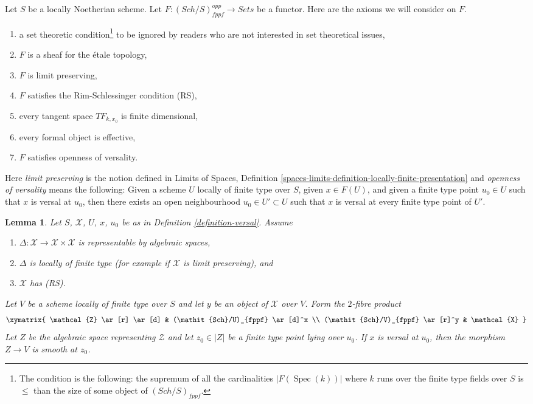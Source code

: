 \documentclass{amsart}
\theoremstyle{plain}
\newtheorem{lemma}[subsection]{Lemma}
\theoremstyle{definition}
\theoremstyle{remark}
\numberwithin{equation}{subsection}
\def\Spec{\mathop{\mathrm{Spec}}}
\def\Sch{\mathit{Sch}}
\begin{document}
\medskip\noindent
Let $S$ be a locally Noetherian scheme. Let
$F : (\Sch/S)_{fppf}^{opp} \to \textit{Sets}$ be a functor.
Here are the axioms we will consider on $F$.
\begin{enumerate}
\item[{[-1]}]  a set theoretic condition\footnote{The condition is the
following: the supremum of all the cardinalities
$|F(\Spec(k))|$ where $k$ runs over the finite
type fields over $S$ is $\leq$ than the size of some
object of $(\Sch/S)_{fppf}$.} to be ignored by
readers who are not interested in set theoretical issues,
\item[{[0]}] $F$ is a sheaf for the \'etale topology,
\item[{[1]}] $F$ is limit preserving,
\item[{[2]}] $F$ satisfies the Rim-Schlessinger condition (RS),
\item[{[3]}] every tangent space $TF_{k, x_0}$ is finite dimensional,
\item[{[4]}] every formal object is effective,
\item[{[5]}] $F$ satisfies openness of versality.
\end{enumerate}
Here {\it limit preserving} is the notion defined in
Limits of Spaces, Definition
\ref{spaces-limits-definition-locally-finite-presentation} and
{\it openness of versality} means the following: Given a scheme $U$
locally of finite type over $S$, given $x \in F(U)$, and given
a finite type point $u_0 \in U$ such that $x$ is versal at $u_0$,
then there exists an open neighbourhood $u_0 \in U' \subset U$
such that $x$ is versal at every finite type point of $U'$.








\begin{lemma}
\label{lemma-base-change-versal}
Let $S$, $\mathcal{X}$, $U$, $x$, $u_0$ be as in
Definition \ref{definition-versal}. Assume
\begin{enumerate}
\item $\Delta : \mathcal{X} \to \mathcal{X} \times \mathcal{X}$
is representable by algebraic spaces,
\item $\Delta$ is locally of finite type
(for example if $\mathcal{X}$ is limit preserving), and
\item $\mathcal{X}$ has (RS).
\end{enumerate}
Let $V$ be a scheme locally of finite type over $S$
and let $y$ be an object of $\mathcal{X}$ over $V$.
Form the $2$-fibre product
$$
\xymatrix{
\mathcal{Z} \ar[r] \ar[d] & (\Sch/U)_{fppf} \ar[d]^x \\
(\Sch/V)_{fppf} \ar[r]^y & \mathcal{X}
}
$$
Let $Z$ be the algebraic space representing $\mathcal{Z}$
and let $z_0 \in |Z|$ be a finite type point lying over $u_0$.
If $x$ is versal at $u_0$, then
the morphism $Z \to V$ is smooth at $z_0$.
\end{lemma}
\end{document}
